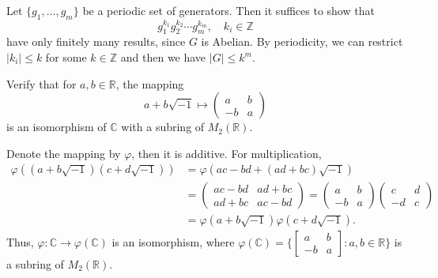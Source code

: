 \begin{solution}
    Let $\{g_{1},\dots,g_{m}\}$ be a  periodic set of generators. Then it suffices to show that
        \[
            g_{1}^{k_{1}}g_{2}^{k_{2}}\cdots g_{m}^{k_{m}},\quad k_{i}\in\mathbb{Z}
        \]
    have only finitely many results, since $G$ is Abelian. By periodicity, we can restrict $|k_{i}|\leq k$ for some $k\in\mathbb{Z}$ and then 
    we have $|G|\leq k^{m}$.
\end{solution}

\setcounter{pb}{24}
\begin{problem}
    Verify that for $ a, b \in \mathbb{R} $, the mapping  
    \[
    a + b \sqrt{-1} \mapsto 
    \begin{pmatrix}
        a & b \\
        -b & a
    \end{pmatrix}
    \]
    is an isomorphism of $\mathbb{C}$ with a subring of $ M_2(\mathbb{R}) $.
\end{problem}

\begin{solution}
    Denote the mapping by $\varphi$, then it is additive. For multiplication, 
        \[
            \begin{split}
                \varphi((a+b\sqrt{-1})(c+d\sqrt{-1}))
                &=\varphi(a c-b d+(a d+b c)\sqrt{-1})\\
                &=
                \begin{pmatrix}
                    a c-b d& a d+b c\\
                    a d+b c& a c-b d
                \end{pmatrix}
                =
                \begin{pmatrix}
                    a & b \\
                    -b & a
                \end{pmatrix}
                \begin{pmatrix}
                    c & d \\
                    -d & c            
                \end{pmatrix}\\
                &=\varphi(a+b\sqrt{-1})\varphi(c+d\sqrt{-1}).
            \end{split}
        \]
    Thus, $\varphi\colon \mathbb{C}\to\varphi(\mathbb{C})$ is an isomorphism, where $\varphi(\mathbb{C})=\Bigg\{
    \begin{bmatrix}
        a&b\\-b&a
    \end{bmatrix}:a,b\in\mathbb{R}\Bigg\}$ is a subring of $M_{2}(\mathbb{R})$. 
\end{solution}

